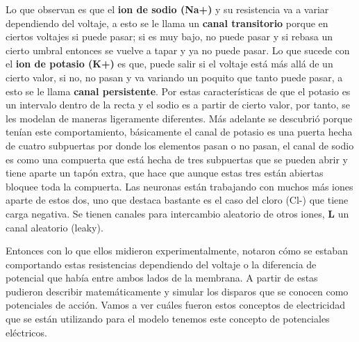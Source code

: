 Lo que observan es que el \textbf{ion de sodio (Na+)} y su resistencia va a variar dependiendo del voltaje, a esto se le llama un \textbf{canal transitorio} porque en ciertos voltajes si puede pasar; si es muy bajo, no puede pasar y si rebasa un cierto umbral entonces se vuelve a tapar y ya no puede pasar. 
Lo que sucede con el \textbf{ion de potasio (K+)} es que, puede salir si el voltaje está más allá de un cierto valor, si no, no pasan y va variando un poquito que tanto puede pasar, a esto se le llama \textbf{canal persistente}. Por estas características de que el potasio es un intervalo dentro de la recta y el sodio es a partir de cierto valor, por tanto, se les modelan de maneras ligeramente diferentes. Más adelante se descubrió porque tenían este comportamiento, básicamente el canal de potasio es una puerta hecha de cuatro subpuertas por donde los elementos pasan o no pasan, el canal de sodio es como una compuerta que está hecha de tres subpuertas que se pueden abrir y tiene aparte un tapón extra, que hace que aunque estas tres están abiertas bloquee toda la compuerta.
Las neuronas están trabajando con muchos más iones aparte de estos dos, uno que destaca bastante es el caso del cloro (Cl-) que tiene carga negativa. Se tienen canales para intercambio aleatorio de otros iones, \textbf{L} un canal aleatorio (leaky).

Entonces con lo que ellos midieron experimentalmente, notaron cómo se estaban comportando estas resistencias dependiendo del voltaje o la diferencia de potencial que había entre ambos lados de la membrana. A partir de estas pudieron describir matemáticamente y simular los disparos que se conocen como potenciales de acción. Vamos a ver cuáles fueron estos conceptos de electricidad que se están utilizando para el modelo tenemos este concepto de potenciales eléctricos.


